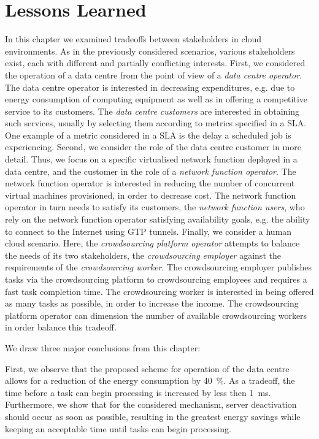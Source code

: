 \section{Lessons Learned}\label{sec:cloud:lessons_learned}
In this chapter we examined tradeoffs between stakeholders in cloud environments.
As in the previously considered scenarios, various stakeholders exist, each with different and partially conflicting interests.
First, we considered the operation of a data centre from the point of view of a \emph{data centre operator}.
The data centre operator is interested in decreasing expenditures, e.g. due to energy consumption of computing equipment as well as in offering a competitive service to its customers.
The \emph{data centre customers} are interested in obtaining such services, usually by selecting them according to metrics specified in a \gls{SLA}.
One example of a metric considered in a \gls{SLA} is the delay a scheduled job is experiencing.
Second, we consider the role of the data centre customer in more detail.
Thus, we focus on a specific virtualised network function deployed in a data centre, and the customer in the role of a \emph{network function operator}.
The network function operator is interested in reducing the number of concurrent virtual machines provisioned, in order to decrease cost.
The network function operator in turn needs to satisfy its customers, the \emph{network function users}, who rely on the network function operator satisfying availability goals, e.g. the ability to connect to the Internet using \gls{GTP} tunnels.
Finally, we consider a human cloud scenario.
Here, the \emph{crowdsourcing platform operator} attempts to balance the needs of its two stakeholders, the \emph{crowdsourcing employer} against the requirements of the \emph{crowdsourcing worker}.
The crowdsourcing employer publishes tasks via the crowdsourcing platform to crowdsourcing employees and requires a fast task completion time.
The crowdsourcing worker is interested in being offered as many tasks as possible, in order to increase the income.
The crowdsourcing platform operator can dimension the number of available crowdsourcing workers in order balance this tradeoff. 

We draw three major conclusions from this chapter:

First, we observe that the proposed scheme for operation of the data centre allows for a reduction of the energy consumption by \SI{40}{\percent}.
As a tradeoff, the time before a task can begin processing is increased by less then \SI{1}{\milli\second}.
Furthermore, we show that for the considered mechanism, server deactivation should occur as soon as possible, resulting in the greatest energy savings while keeping an acceptable time until tasks can begin processing. 

